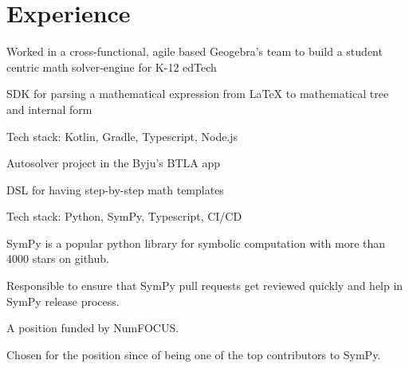 \documentclass[]{deedy-resume-openfont}
\begin{document}
\begin{minipage}[t]{0.66\textwidth}


\section{Experience}

\vspace{\topsep} %
\vspace{\topsep}
\begin{tightemize}
\item Worked in a cross-functional, agile based Geogebra's team to build a student centric math solver-engine for K-12 edTech
\item SDK for parsing a mathematical expression from LaTeX to mathematical tree and internal form
\item Tech stack: Kotlin, Gradle, Typescript, Node.js
\end{tightemize}
\sectionsep

\vspace{\topsep} %
\vspace{\topsep}
\begin{tightemize}
\item Autosolver project in the Byju's BTLA app
\item DSL for having step-by-step math templates
\item Tech stack: Python, SymPy, Typescript, CI/CD
\end{tightemize}
\sectionsep


\vspace{\topsep} %
\vspace{\topsep}
\begin{tightemize}
\item SymPy is a popular python library for symbolic computation with more than 4000 stars on github.
\item Responsible to ensure that SymPy pull requests get reviewed quickly and help in SymPy release process.
\item A position funded by NumFOCUS.
\item Chosen for the position since of being one of the top contributors to SymPy.
\end{tightemize}
\sectionsep


\end{minipage}
\end{document}
